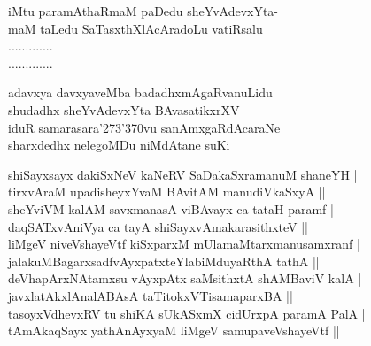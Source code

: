 \begin{entry}
\begin{shl}
iMtu paramAthaRmaM paDedu sheYvAdevxYta-\\
maM taLedu SaTasxthXlAcAradoLu vatiRsalu\\
.............\\
.............
\end{shl}
\begin{shl}
adavxya davxyaveMba badadhxmAgaRvanuLidu\\
shudadhx sheYvAdevxYta BAvasatikxrXV\\
iduR samarasara\char'273\char'370vu sanAmxgaRdAcaraNe\\
sharxdedhx nelegoMDu niMdAtane suKi
\end{shl}
\end{entry}

\begin{entry}
\begin{shl}
shiSayxsayx dakiSxNeV kaNeRV SaDakaSxramanuM shaneYH |\\
tirxvAraM upadisheyxYvaM BAvitAM manudiVkaSxyA ||\\
sheYviVM kalAM savxmanasA viBAvayx ca tataH paramf |\\
daqSATxvAniVya ca tayA shiSayxvAmakarasithxteV ||\\
liMgeV niveVshayeVtf kiSxparxM mUlamaMtarxmanusamxranf |\\
jalakuMBagarxsadfvAyxpatxteYlabiMduyaRthA tathA ||\\
deVhapArxNAtamxsu vAyxpAtx saMsithxtA shAMBaviV kalA |\\
javxlatAkxlAnalABAsA taTitokxVTisamaparxBA ||\\
tasoyxVdhevxRV tu shiKA sUkASxmX cidUrxpA paramA PalA |\\
tAmAkaqSayx yathAnAyxyaM liMgeV samupaveVshayeVtf ||
\end{shl}
\end{entry}

